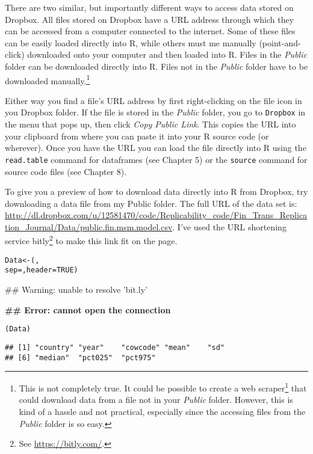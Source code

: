 There are two similar, but importantly different ways to access data stored on Dropbox. All files stored on Dropbox have a URL address through which they can be accessed from a computer connected to the internet. Some of these files can be easily loaded directly into R, while others must me manually (point-and-click) downloaded onto your computer and then loaded into R. Files in the \emph{Public} folder can be downloaded directly into R. Files not in the \emph{Public} folder have to be downloaded  manually.\footnote{This is not completely true. It could be possible to create a web scraper\footnote{web scraper} that could download data from a file not in your \emph{Public} folder. However, this is kind of a hassle and not practical, especially since the accessing files from the \emph{Public} folder is so easy.}

Either way you find a file's URL address by first right-clicking on the file icon in you Dropbox folder. If the file is stored in the \emph{Public} folder, you go to \texttt{Dropbox} in the menu that pops up, then click \emph{Copy Public Link}. This copies the URL into your clipboard from where you can paste it into your R source code (or wherever). Once you have the URL you can load the file directly into R using the \texttt{read.table} command for dataframes (see Chapter 5) or the \texttt{source} command for source code files (see Chapter 8).

To give you a preview of how to download data directly into R from Dropbox, try downloading a data file from my Public folder. The full URL of the data set is: \url{http://dl.dropbox.com/u/12581470/code/Replicability_code/Fin_Trans_Replication_Journal/Data/public.fin.msm.model.csv}. I've used the URL shortening service bitly\footnote{See \url{https://bitly.com/}.}
to make this link fit on the page.

\begin{knitrout}
\color{fgcolor}\begin{kframe}
\begin{alltt}
Data <- (, 
                    sep = , header = TRUE)
\end{alltt}


{\ttfamily\noindent\textcolor{warningcolor}{\#\# Warning: unable to resolve 'bit.ly'}}

{\ttfamily\noindent\bfseries\textcolor{errorcolor}{\#\# Error: cannot open the connection}}\begin{alltt}
                    
(Data)
\end{alltt}
\begin{verbatim}
## [1] "country" "year"    "cowcode" "mean"    "sd"     
## [6] "median"  "pct025"  "pct975"
\end{verbatim}
\end{kframe}
\end{knitrout}


